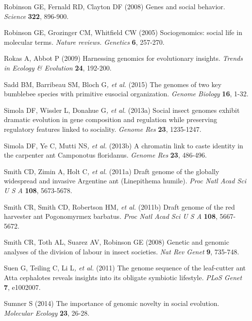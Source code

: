 \documentclass[]{article}
\begin{document}
\protect\hypertarget{ux5fENREFux5f48}{}{}Robinson GE, Fernald RD,
Clayton DF (2008) Genes and social behavior. \emph{Science}
\textbf{322}, 896-900.

\protect\hypertarget{ux5fENREFux5f49}{}{}Robinson GE, Grozinger CM,
Whitfield CW (2005) Sociogenomics: social life in molecular terms.
\emph{Nature reviews. Genetics} \textbf{6}, 257-270.

\protect\hypertarget{ux5fENREFux5f50}{}{}Rokas A, Abbot P (2009)
Harnessing genomics for evolutionary insights. \emph{Trends in Ecology
\& Evolution} \textbf{24}, 192-200.

\protect\hypertarget{ux5fENREFux5f51}{}{}Sadd BM, Barribeau SM, Bloch
G\emph{, et al.} (2015) The genomes of two key bumblebee species with
primitive eusocial organization. \emph{Genome Biology} \textbf{16},
1-32.

\protect\hypertarget{ux5fENREFux5f52}{}{}Simola DF, Wissler L, Donahue
G\emph{, et al.} (2013a) Social insect genomes exhibit dramatic
evolution in gene composition and regulation while preserving regulatory
features linked to sociality. \emph{Genome Res} \textbf{23}, 1235-1247.

\protect\hypertarget{ux5fENREFux5f53}{}{}Simola DF, Ye C, Mutti
NS\emph{, et al.} (2013b) A chromatin link to caste identity in the
carpenter ant Camponotus floridanus. \emph{Genome Res} \textbf{23},
486-496.

\protect\hypertarget{ux5fENREFux5f54}{}{}Smith CD, Zimin A, Holt
C\emph{, et al.} (2011a) Draft genome of the globally widespread and
invasive Argentine ant (Linepithema humile). \emph{Proc Natl Acad Sci U
S A} \textbf{108}, 5673-5678.

\protect\hypertarget{ux5fENREFux5f55}{}{}Smith CR, Smith CD, Robertson
HM\emph{, et al.} (2011b) Draft genome of the red harvester ant
Pogonomyrmex barbatus. \emph{Proc Natl Acad Sci U S A} \textbf{108},
5667-5672.

\protect\hypertarget{ux5fENREFux5f56}{}{}Smith CR, Toth AL, Suarez AV,
Robinson GE (2008) Genetic and genomic analyses of the division of
labour in insect societies. \emph{Nat Rev Genet} \textbf{9}, 735-748.

\protect\hypertarget{ux5fENREFux5f57}{}{}Suen G, Teiling C, Li L\emph{,
et al.} (2011) The genome sequence of the leaf-cutter ant Atta
cephalotes reveals insights into its obligate symbiotic lifestyle.
\emph{PLoS Genet} \textbf{7}, e1002007.

\protect\hypertarget{ux5fENREFux5f58}{}{}Sumner S (2014) The importance
of genomic novelty in social evolution. \emph{Molecular Ecology}
\textbf{23}, 26-28.
\end{document}
